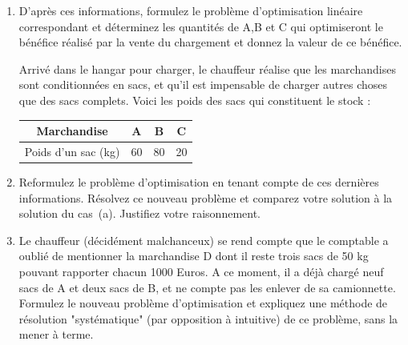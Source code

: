 \begin{enumerate}
    \begin{enumerate}
      \item D'après ces informations, formulez le problème d'optimisation
        linéaire correspondant et déterminez les quantités de A,B et C qui
        optimiseront le bénéfice réalisé par la vente du chargement et
        donnez la valeur de ce bénéfice.

        \vspace{6pt} Arrivé dans le hangar pour charger, le chauffeur
        réalise que les marchandises sont conditionnées en sacs, et qu'il
        est impensable de charger autres choses que des sacs complets.
        Voici les poids des sacs qui constituent le stock :
        \begin{center}
          \begin{tabular}{|c|c|c|c|}
            \hline %
            Marchandise & A & B & C\\
            \hline
            Poids d'un sac (kg) & 60 & 80 & 20 \\
            \hline
          \end{tabular}
        \end{center}

      \item Reformulez le problème d'optimisation en tenant compte de ces
        dernières informations. Résolvez ce nouveau problème et comparez
        votre solution à la solution du cas~(a). Justifiez votre
        raisonnement.

      \item Le chauffeur (décidément malchanceux) se rend compte que le
        comptable a oublié de mentionner la marchandise D dont il reste
        trois sacs de 50 kg pouvant rapporter chacun 1000 Euros. A ce
        moment, il a déjà chargé neuf sacs de A et deux sacs de B, et ne
        compte pas les enlever de sa camionnette. Formulez le nouveau
        problème d'optimisation et expliquez une méthode de résolution
        "systématique" (par opposition à intuitive) de ce problème, sans la
        mener à terme.

    \end{enumerate}

    \begin{solution}
      \nosolution
    \end{solution}

\end{enumerate}
